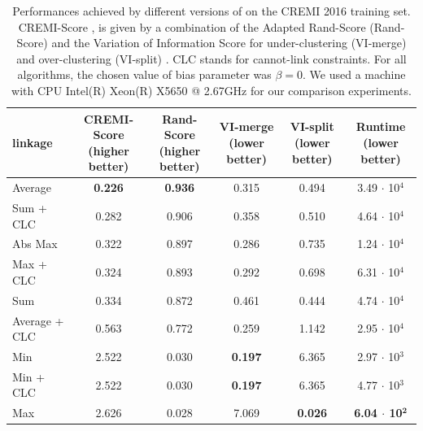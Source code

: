 \begin{table}[t]
\centering
    \footnotesize
        \begin{tabular}{l|c|c|c|c|c}
          \algname{} linkage & \makecell{CREMI-Score\\(higher better)}  & \makecell{Rand-Score\\(higher better)} & \makecell{VI-merge\\(lower better)} & \makecell{VI-split\\(lower better)} & \makecell{Runtime\\(lower better)} \\ \midrule

Average & \textbf{0.226} & \textbf{0.936} & 0.315 & 0.494 & 3.49 $\cdot$ 10$^4$ \\
Sum + CLC \cite{levinkov2017comparative} & 0.282 & 0.906 & 0.358 & 0.510 & 4.64 $\cdot$ 10$^4$ \\
Abs Max \cite{wolf2018mutex} & 0.322 & 0.897 & 0.286 & 0.735 & 1.24 $\cdot$ 10$^4$ \\
Max + CLC & 0.324 & 0.893 & 0.292 & 0.698 & 6.31 $\cdot$ 10$^4$ \\
Sum \cite{keuper2015efficient} & 0.334 & 0.872 & 0.461 & 0.444 & 4.74 $\cdot$ 10$^4$ \\
Average + CLC & 0.563 & 0.772 & 0.259  & 1.142 & 2.95 $\cdot$ 10$^4$ \\
Min & 2.522 & 0.030 & \textbf{0.197} & 6.365 & 2.97 $\cdot$ 10$^3$ \\
Min + CLC & 2.522 & 0.030 & \textbf{0.197}  & 6.365 & 4.77 $\cdot$ 10$^3$ \\
Max & 2.626 & 0.028 & 7.069 & \textbf{0.026} & \textbf{6.04 $\cdot$ 10$^\mathbf{2}$} \\
        \end{tabular}
        \vspace*{1.1em}
    \caption{Performances achieved by different versions of \algname{} on the CREMI 2016 training set. 
    CREMI-Score \cite{cremiChallenge}, is given by a combination of the Adapted Rand-Score (Rand-Score) and the Variation of Information Score for under-clustering (VI-merge) and over-clustering (VI-split) \cite{arganda2015crowdsourcing}.
    CLC stands for cannot-link constraints. For all algorithms, the chosen value of bias parameter was $\beta = 0$. We used a machine with CPU Intel(R) Xeon(R) X5650  @ 2.67GHz for our comparison experiments.}
    \label{tab:extended_results_cremi}
\end{table}
